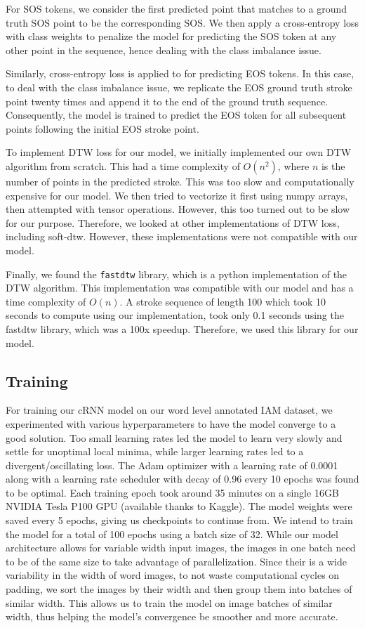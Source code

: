 \documentclass[10pt,twocolumn,letterpaper]{article}
\begin{document}
For SOS tokens, we consider the first predicted point that matches to a ground truth SOS point to be the corresponding SOS. We then apply a cross-entropy loss with class weights to penalize the model for predicting the SOS token at any other point in the sequence, hence dealing with the class imbalance issue.

Similarly, cross-entropy loss is applied to for predicting EOS tokens. 
In this case, to deal with the class imbalance issue, we replicate the EOS ground truth stroke point twenty times and append it to the end of the ground truth sequence. Consequently, the model is trained to predict the EOS token for all subsequent points following the initial EOS stroke point.

To implement DTW loss for our model, we initially implemented our own DTW algorithm from scratch. This had a time complexity of $O(n^2)$, where $n$ is the number of points in the predicted stroke. This was too slow and computationally expensive for our model. We then tried to vectorize it first using numpy arrays, then attempted with tensor operations. However, this too turned out to be slow for our purpose. Therefore, we looked at other implementations of DTW loss, including soft-dtw. However, these implementations were not compatible with our model.

Finally, we found the \texttt{fastdtw} library, which is a python implementation of the DTW algorithm. This implementation was compatible with our model and has a time complexity of $O(n)$. A stroke sequence of length 100 which took 10 seconds to compute using our implementation, took only 0.1 seconds using the fastdtw library, which was a 100x speedup. Therefore, we used this library for our model.



\subsection{Training}
For training our cRNN model on our word level annotated IAM dataset, we experimented with various hyperparameters to have the model converge to a good solution. Too small learning rates led the model to learn very slowly and settle for unoptimal local minima, while larger learning rates led to a divergent/oscillating loss. The Adam optimizer with a learning rate of 0.0001 along with a learning rate scheduler with decay of 0.96 every 10 epochs was found to be optimal. Each training epoch took around 35 minutes on a single 16GB NVIDIA Tesla P100 GPU (available thanks to Kaggle). The model weights were saved every 5 epochs, giving us checkpoints to continue from. We intend to train the model for a total of 100 epochs using a batch size of 32. While our model architecture allows for variable width input images, the images in one batch need to be of the same size to take advantage of parallelization. Since their is a wide variability in the width of word images, to not waste computational cycles on padding, we sort the images by their width and then group them into batches of similar width. This allows us to train the model on image batches of similar width, thus helping the model's convergence be smoother and more accurate.
\end{document}
